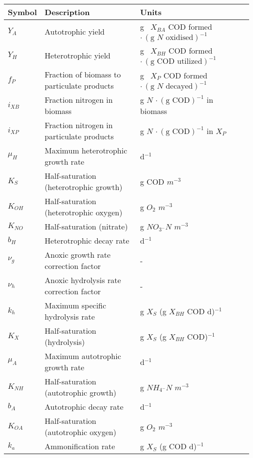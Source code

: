 \documentclass[preview,multi=pg,crop]{standalone}
\begin{document}
\begin{pg}

    \begin{tabular}{l | l l l}
        Symbol 	& Description  & Units \\ \hline \hline 
        $Y_A$    	& Autotrophic yield                           				 & g \, $X_{BA}$ COD formed $\cdot \, (\text{g $N$ oxidised})^{-1}$ \\
        $Y_H$    	& Heterotrophic yield                         				 & g \, $X_{BH}$ COD formed $\cdot \, (\text{g COD utilized})^{-1}$ \\
        $f_P$    	& Fraction of biomass to particulate products 		& g \, $X_{P}$ COD formed $\cdot \, (\text{g $N$ decayed})^{-1}$   \\
        $i_{XB}$ 	& Fraction nitrogen in biomass                			 & g $N$ $\cdot \, (\text{g COD})^{-1}$ in biomass                  \\
        $i_{XP}$ 	& Fraction nitrogen in particulate products    & g $N$ $\cdot \, (\text{g COD})^{-1}$ in $X_P$ \\ \hline 
        $\mu_H$  & Maximum heterotrophic growth rate        & d$^{-1}$                          \\
        $K_S$    & Half-saturation (heterotrophic growth)    & g COD $m^{-3}$                    \\
        $K_{OH}$ & Half-saturation (heterotrophic oxygen)    & g $O_2$ $m^{-3}$                  \\
        $K_{NO}$ & Half-saturation (nitrate)                 & g $NO_{3^-}N$ $m^{-3}$            \\
        $b_H$    & Heterotrophic decay rate                 & d$^{-1}$                          \\
        $\nu_g$  & Anoxic growth rate correction factor     & -                     \\
        $\nu_h$  & Anoxic hydrolysis rate correction factor & -                     \\
        $k_h$    & Maximum specific hydrolysis rate          & g $X_S$ (g $X_{BH}$ COD d)$^{-1}$ \\
        $K_X$    & Half-saturation (hydrolysis)             & g $X_S$ (g $X_{BH}$ COD)$^{-1}$   \\
        $\mu_A$  & Maximum autotrophic growth rate           & d$^{-1}$                          \\
        $K_{NH}$ & Half-saturation (autotrophic growth)      & g $NH_{4^-}N$ $m^{-3}$            \\
        $b_A$    & Autotrophic decay rate                   & d$^{-1}$                          \\
        $K_{OA}$ & Half-saturation (autotrophic oxygen)      & g $O_2$ $m^{-3}$                  \\
        $k_a$    & Ammonification rate                       & g $X_S$ (g COD d)$^{-1}$ 
    \end{tabular}%
    
\end{pg}
\end{document}
